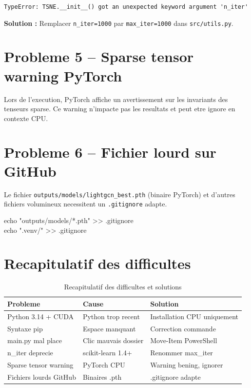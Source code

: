 \documentclass[12pt,a4paper]{report}
\begin{document}
\begin{lstlisting}[style=bash,caption={Erreur t-SNE}]
TypeError: TSNE.__init__() got an unexpected keyword argument 'n_iter'
\end{lstlisting}

\textbf{Solution :} Remplacer \texttt{n\_iter=1000} par
\texttt{max\_iter=1000} dans \texttt{src/utils.py}.

\section{Probleme 5 -- Sparse tensor warning PyTorch}

Lors de l'execution, PyTorch affiche un avertissement sur
les invariants des tenseurs sparse. Ce warning n'impacte pas
les resultats et peut etre ignore en contexte CPU.

\section{Probleme 6 -- Fichier lourd sur GitHub}

Le fichier \texttt{outputs/models/lightgcn\_best.pth} (binaire PyTorch)
et d'autres fichiers volumineux necessitent un \texttt{.gitignore}
adapte.

\begin{cmdbox}[-- .gitignore]
echo "outputs/models/*.pth" >> .gitignore\\
echo ".venv/" >> .gitignore
\end{cmdbox}

\section{Recapitulatif des difficultes}

\begin{table}[H]
\centering
\caption{Recapitulatif des difficultes et solutions}
\begin{tabular}{p{3.8cm}p{3cm}p{5cm}}
\toprule
\textbf{Probleme} & \textbf{Cause} & \textbf{Solution} \\
\midrule
Python 3.14 + CUDA & Python trop recent &
  Installation CPU uniquement \\
\rowcolor{rowgray}
Syntaxe pip & Espace manquant &
  Correction commande \\
main.py mal place & Clic mauvais dossier &
  Move-Item PowerShell \\
\rowcolor{rowgray}
n\_iter deprecie & scikit-learn 1.4+ &
  Renommer max\_iter \\
Sparse tensor warning & PyTorch CPU & Warning bening, ignorer \\
\rowcolor{rowgray}
Fichiers lourds GitHub & Binaires .pth & .gitignore adapte \\
\bottomrule
\end{tabular}
\end{table}
\end{document}
